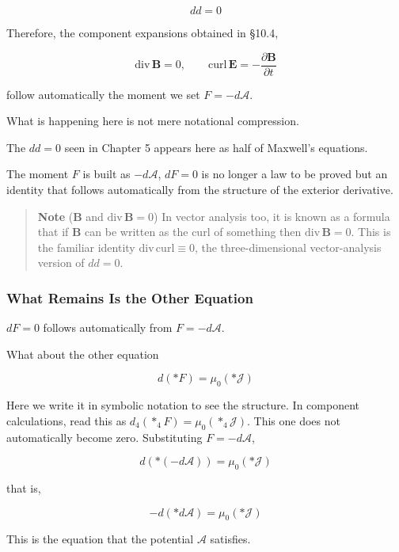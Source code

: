\[
dd=0
\]

Therefore, the component expansions obtained in §10.4,

\[
\mathrm{div}\,\mathbf{B}=0,
\qquad
\mathrm{curl}\,\mathbf{E}
=
-\frac{\partial\mathbf{B}}{\partial t}
\]

follow automatically the moment we set \(F=-d\mathcal{A}\).

What is happening here is not mere notational compression.

The \(dd=0\) seen in Chapter 5 appears here as half of Maxwell's
equations.

The moment \(F\) is built as \(-d\mathcal{A}\), \(dF=0\) is no longer a
law to be proved but an identity that follows automatically from the
structure of the exterior derivative.

\begin{quote}
\textbf{Note} (\(\mathbf{B}\) and \(\mathrm{div}\,\mathbf{B}=0\)) In
vector analysis too, it is known as a formula that if \(\mathbf{B}\) can
be written as the curl of something then \(\mathrm{div}\,\mathbf{B}=0\).
This is the familiar identity \(\mathrm{div}\,\mathrm{curl}\equiv0\),
the three-dimensional vector-analysis version of \(dd=0\).
\end{quote}

\hypertarget{what-remains-is-the-other-equation}{%
\subsubsection{What Remains Is the Other
Equation}\label{what-remains-is-the-other-equation}}

\(dF=0\) follows automatically from \(F=-d\mathcal{A}\).

What about the other equation

\[
d(\ast F)
=
\mu_0(\ast\mathcal{J})
\]

Here we write it in symbolic notation to see the structure. In component
calculations, read this as \(d_4(\ast_4F)=\mu_0(\ast_4\mathcal{J})\).
This one does not automatically become zero. Substituting
\(F=-d\mathcal{A}\),

\[
d(\ast(-d\mathcal{A}))
=
\mu_0(\ast\mathcal{J})
\]

that is,

\[
-d(\ast d\mathcal{A})
=
\mu_0(\ast\mathcal{J})
\]

This is the equation that the potential \(\mathcal{A}\) satisfies.


